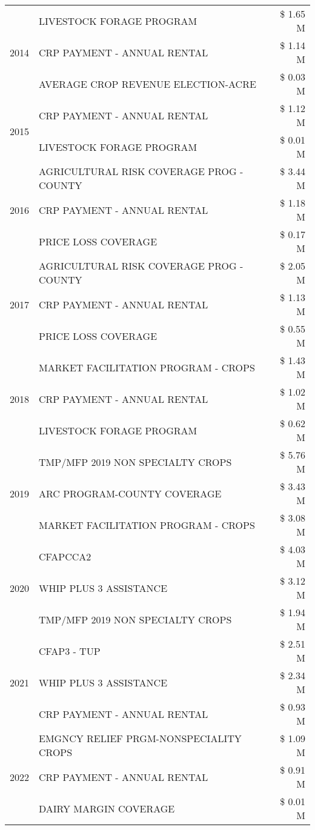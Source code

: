 \begin{tabular}{llr}
\multirow[t]{3}{*}{2014} & LIVESTOCK FORAGE PROGRAM & \$ 1.65 M \\
 & CRP PAYMENT - ANNUAL RENTAL & \$ 1.14 M \\
 & AVERAGE CROP REVENUE ELECTION-ACRE & \$ 0.03 M \\
\cline{1-3}
\multirow[t]{2}{*}{2015} & CRP PAYMENT - ANNUAL RENTAL & \$ 1.12 M \\
 & LIVESTOCK FORAGE PROGRAM & \$ 0.01 M \\
\cline{1-3}
\multirow[t]{3}{*}{2016} & AGRICULTURAL RISK COVERAGE PROG - COUNTY & \$ 3.44 M \\
 & CRP PAYMENT - ANNUAL RENTAL & \$ 1.18 M \\
 & PRICE LOSS COVERAGE & \$ 0.17 M \\
\cline{1-3}
\multirow[t]{3}{*}{2017} & AGRICULTURAL RISK COVERAGE PROG - COUNTY & \$ 2.05 M \\
 & CRP PAYMENT - ANNUAL RENTAL & \$ 1.13 M \\
 & PRICE LOSS COVERAGE & \$ 0.55 M \\
\cline{1-3}
\multirow[t]{3}{*}{2018} & MARKET FACILITATION PROGRAM - CROPS & \$ 1.43 M \\
 & CRP PAYMENT - ANNUAL RENTAL & \$ 1.02 M \\
 & LIVESTOCK FORAGE PROGRAM & \$ 0.62 M \\
\cline{1-3}
\multirow[t]{3}{*}{2019} & TMP/MFP 2019 NON SPECIALTY CROPS & \$ 5.76 M \\
 & ARC PROGRAM-COUNTY COVERAGE & \$ 3.43 M \\
 & MARKET FACILITATION PROGRAM - CROPS & \$ 3.08 M \\
\cline{1-3}
\multirow[t]{3}{*}{2020} & CFAPCCA2 & \$ 4.03 M \\
 & WHIP PLUS 3 ASSISTANCE & \$ 3.12 M \\
 & TMP/MFP 2019 NON SPECIALTY CROPS & \$ 1.94 M \\
\cline{1-3}
\multirow[t]{3}{*}{2021} & CFAP3 - TUP & \$ 2.51 M \\
 & WHIP PLUS 3 ASSISTANCE & \$ 2.34 M \\
 & CRP PAYMENT - ANNUAL RENTAL & \$ 0.93 M \\
\cline{1-3}
\multirow[t]{3}{*}{2022} & EMGNCY RELIEF PRGM-NONSPECIALITY CROPS & \$ 1.09 M \\
 & CRP PAYMENT - ANNUAL RENTAL & \$ 0.91 M \\
 & DAIRY MARGIN COVERAGE & \$ 0.01 M \\
\cline{1-3}
\bottomrule
\end{tabular}
